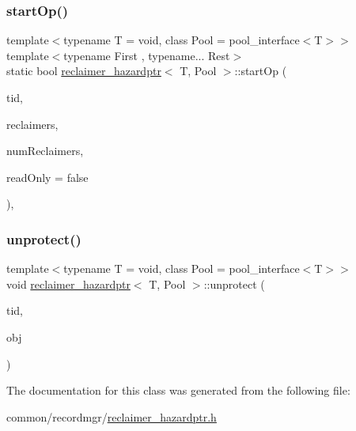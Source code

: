 \mbox{\label{classreclaimer__hazardptr_a38edde73863d8d8aaefd65f591842730}} 
\subsubsection{\texorpdfstring{start\+Op()}{startOp()}}
{\footnotesize\ttfamily template$<$typename T  = void, class Pool  = pool\+\_\+interface$<$\+T$>$$>$ \\
template$<$typename First , typename... Rest$>$ \\
static bool \hyperlink{classreclaimer__hazardptr}{reclaimer\+\_\+hazardptr}$<$ T, Pool $>$\+::start\+Op (\begin{DoxyParamCaption}\item[{const int}]{tid,  }\item[{void $\ast$const $\ast$const}]{reclaimers,  }\item[{const int}]{num\+Reclaimers,  }\item[{const bool}]{read\+Only = {\ttfamily false} }\end{DoxyParamCaption})\hspace{0.3cm}{\ttfamily [inline]}, {\ttfamily [static]}}

\mbox{\label{classreclaimer__hazardptr_acf0f5797625cfe4838275015f421379d}} 
\subsubsection{\texorpdfstring{unprotect()}{unprotect()}}
{\footnotesize\ttfamily template$<$typename T  = void, class Pool  = pool\+\_\+interface$<$\+T$>$$>$ \\
void \hyperlink{classreclaimer__hazardptr}{reclaimer\+\_\+hazardptr}$<$ T, Pool $>$\+::unprotect (\begin{DoxyParamCaption}\item[{const int}]{tid,  }\item[{T $\ast$const}]{obj }\end{DoxyParamCaption})\hspace{0.3cm}{\ttfamily [inline]}}



The documentation for this class was generated from the following file\+:\begin{DoxyCompactItemize}
\item 
common/recordmgr/\hyperlink{reclaimer__hazardptr_8h}{reclaimer\+\_\+hazardptr.\+h}\end{DoxyCompactItemize}
